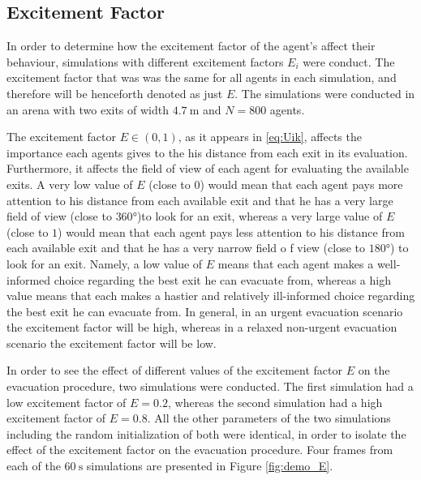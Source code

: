 \subsection{Excitement Factor} \label{sec:6.3-excitement}
In order to determine how the excitement factor of the agent's affect their behaviour, simulations with different excitement factors $E_i$ were conduct. The excitement factor that was was the same for all agents in each simulation, and therefore will be henceforth denoted as just $E$. The simulations were conducted in an arena with two exits of width $\SI{4.7}{\meter}$ and $N=800$ agents.

The excitement factor $E \in (0,1)$, as it appears in \eqref{eq:Uik}, affects the importance each agents gives to the his distance from each exit in its evaluation. Furthermore, it affects the field of view of each agent for evaluating the available exits. A very low value of $E$ (close to $0$) would mean that each agent pays more attention to his distance from each available exit and that he has a very large field of view (close to $\ang{360}$)to look for an exit, whereas a very large value of $E$ (close to $1$) would mean that each agent pays less attention to his distance from each available exit and that he has a very narrow field o f view (close to $\ang{180}$) to look for an exit. Namely, a low value of $E$ means that each agent makes a well-informed choice regarding the best exit he can evacuate from, whereas a high value means that each makes a hastier and relatively ill-informed choice regarding the best exit he can evacuate from. In general, in an urgent evacuation scenario the excitement factor will be high, whereas in a relaxed non-urgent evacuation scenario the excitement factor will be low.

In order to see the effect of different values of the excitement factor $E$ on the evacuation procedure, two simulations were conducted. The first simulation had a low excitement factor of $E=0.2$, whereas the second simulation had a high excitement factor of $E=0.8$. All the other parameters of the two simulations including the random initialization of both were identical, in order to isolate the effect of the excitement factor on the evacuation procedure. Four frames from each of the $\SI{60}{\second}$ simulations are presented in Figure \ref{fig:demo_E}.

